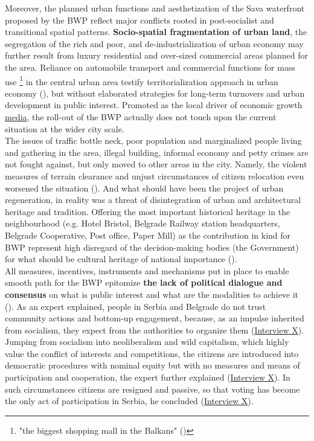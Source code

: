 \documentclass[11pt]{report}
\begin{document}
Moreover, the planned urban functions and aesthetization of the Sava waterfront proposed by the BWP reflect major conflicts rooted in post-socialist and transitional spatial patterns.
\textbf{Socio-spatial fragmentation of urban land}, the segregation of the rich and poor, and de-industrialization of urban economy may further result from luxury residential and over-sized commercial areas planned for the area.
Reliance on automobile transport and commercial functions for mass use
\footnote{"the biggest shopping mall in the Balkans" (\cite{media})}
in the central urban area testify territorialization approach in urban economy (\href{Hirt}{\cite{hirt_belgrade_2009}}), but without elaborated strategies for long-term turnovers and urban development in public interest.
Promoted as the local driver of economic growth \href{ref}{media}, the roll-out of the BWP actually does not touch upon the current situation at the wider city scale.
\\

The issues of traffic bottle neck, poor population and marginalized people living and gathering in the area, illegal building, informal economy and petty crimes are not fought against, but only moved to other areas in the city.
Namely, the violent measures of terrain clearance and unjust circumstances of citizen relocation even worsened the situation (\cite{media}).
And what should have been the project of urban regeneration, in reality was a threat of disintegration of urban and architectural heritage and tradition.
Offering the most important historical heritage in the neighbourhood (e.g. Hotel Bristol, Belgrade Railway station headquarters, Belgrade Cooperative, Post office, Paper Mill) as the contribution in kind for BWP represent high disregard of the decision-making bodies (the Government) for what should be cultural heritage of national importance (\cite{JVA2015}).
\\

All measures, incentives, instruments and mechanisms put in place to enable smooth path for the BWP epitomize \textbf{the lack of political dialogue and consensus} on what is public interest and what are the modalities to achieve it
(\href{Vujosevic}{\cite{vujosevic_post-socialist_2010}}).
As an expert explained, people in Serbia and Belgrade do not trust community actions and bottom-up engagement, because, as an impulse inherited from socialism, they expect from the authorities to organize them
(\href{InterviewX}{Interview X}).
Jumping from socialism into neoliberalism and wild capitalism, which highly value the conflict of interests and competitions, the citizens are introduced into democratic procedures with nominal equity but with no measures and means of participation and cooperation, the expert further explained (\href{InterviewX}{Interview X}).
In such circumstances citizens are resigned and passive, so that voting has become the only act of participation in Serbia, he concluded (\href{InterviewX}{Interview X}).
\\
\end{document}
